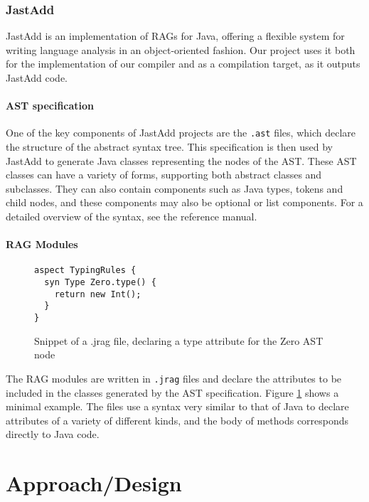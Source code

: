 \documentclass[nofilelist]{cslthse-msc}
\newcommand{\CR}[1]{\textcolor{green!60!black}{[\textbf{CR}:#1]}}
\begin{document}
\subsection{JastAdd}
JastAdd is an implementation of RAGs for Java, offering a flexible system for writing language analysis in an object-oriented fashion.\cite{JastAdd}
Our project uses it both for the implementation of our compiler and as a compilation target, as it outputs JastAdd code.

\subsubsection{AST specification}\label{astdef}
One of the key components of JastAdd projects are the \lstinline{.ast} files, which declare the structure of the abstract syntax tree.
This specification is then used by JastAdd to generate Java classes representing the nodes of the AST.
These AST classes can have a variety of forms, supporting both abstract classes and subclasses.
They can also contain components such as Java types, tokens and child nodes, and these components may also be optional or list components.
For a detailed overview of the syntax, see the reference manual\cite{jastaddref}.

\subsubsection{RAG Modules}
\begin{figure}[h]
\begin{lstlisting}[language=jrag]
aspect TypingRules {
  syn Type Zero.type() {
    return new Int();
  }
}
\end{lstlisting}
  \caption{Snippet of a .jrag file, declaring a type attribute for the Zero AST node}
  \label{jragexample}
\end{figure}
The RAG modules are written in \lstinline{.jrag} files and declare the attributes to be included in the classes generated by the AST specification.
Figure \ref{jragexample} shows a minimal example.
The files use a syntax very similar to that of Java to declare attributes of a variety of different kinds, and the body of methods corresponds directly to Java code.

\chapter{Approach/Design} %
\end{document}
